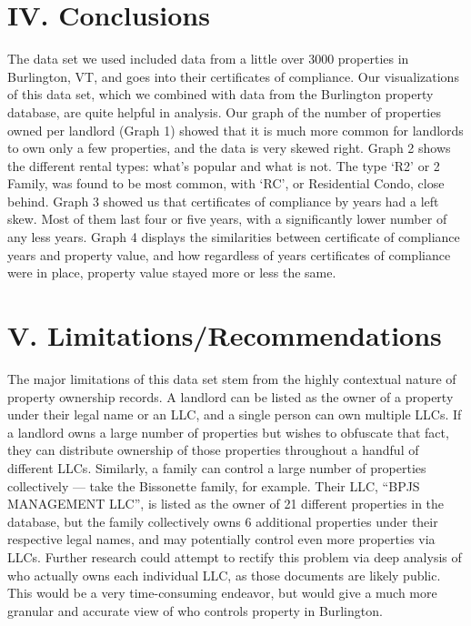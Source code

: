 \documentclass[
]{article}
\begin{document}
\hypertarget{iv.-conclusions}{%
\section{IV. Conclusions}\label{iv.-conclusions}}

The data set we used included data from a little over 3000 properties in
Burlington, VT, and goes into their certificates of compliance. Our
visualizations of this data set, which we combined with data from the
Burlington property database, are quite helpful in analysis. Our graph
of the number of properties owned per landlord (Graph 1) showed that it
is much more common for landlords to own only a few properties, and the
data is very skewed right. Graph 2 shows the different rental types:
what's popular and what is not. The type `R2' or 2 Family, was found to
be most common, with `RC', or Residential Condo, close behind. Graph 3
showed us that certificates of compliance by years had a left skew. Most
of them last four or five years, with a significantly lower number of
any less years. Graph 4 displays the similarities between certificate of
compliance years and property value, and how regardless of years
certificates of compliance were in place, property value stayed more or
less the same.

\hypertarget{v.-limitationsrecommendations}{%
\section{V.
Limitations/Recommendations}\label{v.-limitationsrecommendations}}

The major limitations of this data set stem from the highly contextual
nature of property ownership records. A landlord can be listed as the
owner of a property under their legal name or an LLC, and a single
person can own multiple LLCs. If a landlord owns a large number of
properties but wishes to obfuscate that fact, they can distribute
ownership of those properties throughout a handful of different LLCs.
Similarly, a family can control a large number of properties
collectively --- take the Bissonette family, for example. Their LLC,
``BPJS MANAGEMENT LLC'', is listed as the owner of 21 different
properties in the database, but the family collectively owns 6
additional properties under their respective legal names, and may
potentially control even more properties via LLCs. Further research
could attempt to rectify this problem via deep analysis of who actually
owns each individual LLC, as those documents are likely public. This
would be a very time-consuming endeavor, but would give a much more
granular and accurate view of who controls property in Burlington.
\end{document}
